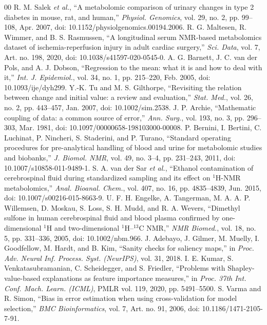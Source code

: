 \documentclass[conference]{IEEEtran}
\begin{document}
\begin{thebibliography}{00}
 R. M. Salek \textit{et al.}, ``A metabolomic comparison of urinary changes in type 2 diabetes in mouse, rat, and human,'' \textit{Physiol. Genomics}, vol. 29, no. 2, pp. 99--108, Apr. 2007, doi: 10.1152/physiolgenomics.00194.2006.
 R. G. Maltesen, R. Wimmer, and B. S. Rasmussen, ``A longitudinal serum NMR-based metabolomics dataset of ischemia-reperfusion injury in adult cardiac surgery,'' \textit{Sci. Data}, vol. 7, Art. no. 198, 2020, doi: 10.1038/s41597-020-0545-0.
 A. G. Barnett, J. C. van der Pols, and A. J. Dobson, ``Regression to the mean: what it is and how to deal with it,'' \textit{Int. J. Epidemiol.}, vol. 34, no. 1, pp. 215--220, Feb. 2005, doi: 10.1093/ije/dyh299.
 Y.-K. Tu and M. S. Gilthorpe, ``Revisiting the relation between change and initial value: a review and evaluation,'' \textit{Stat. Med.}, vol. 26, no. 2, pp. 443--457, Jan. 2007, doi: 10.1002/sim.2538.
 J. P. Archie, ``Mathematic coupling of data: a common source of error,'' \textit{Ann. Surg.}, vol. 193, no. 3, pp. 296--303, Mar. 1981, doi: 10.1097/00000658-198103000-00008.
 P. Bernini, I. Bertini, C. Luchinat, P. Nincheri, S. Staderini, and P. Turano, ``Standard operating procedures for pre-analytical handling of blood and urine for metabolomic studies and biobanks,'' \textit{J. Biomol. NMR}, vol. 49, no. 3--4, pp. 231--243, 2011, doi: 10.1007/s10858-011-9489-1.
 S. A. van der Sar \textit{et al.}, ``Ethanol contamination of cerebrospinal fluid during standardized sampling and its effect on $^1$H-NMR metabolomics,'' \textit{Anal. Bioanal. Chem.}, vol. 407, no. 16, pp. 4835--4839, Jun. 2015, doi: 10.1007/s00216-015-8663-9.
 U. F. H. Engelke, A. Tangerman, M. A. A. P. Willemsen, D. Moskau, S. Loss, S. H. Mudd, and R. A. Wevers, ``Dimethyl sulfone in human cerebrospinal fluid and blood plasma confirmed by one-dimensional $^1$H and two-dimensional $^1$H--$^{13}$C NMR,'' \textit{NMR Biomed.}, vol. 18, no. 5, pp. 331--336, 2005, doi: 10.1002/nbm.966.
 J. Adebayo, J. Gilmer, M. Muelly, I. Goodfellow, M. Hardt, and B. Kim, ``Sanity checks for saliency maps,'' in \textit{Proc. Adv. Neural Inf. Process. Syst. (NeurIPS)}, vol. 31, 2018.
 I. E. Kumar, S. Venkatasubramanian, C. Scheidegger, and S. Friedler, ``Problems with Shapley-value-based explanations as feature importance measures,'' in \textit{Proc. 37th Int. Conf. Mach. Learn. (ICML)}, PMLR vol. 119, 2020, pp. 5491--5500.
 S. Varma and R. Simon, ``Bias in error estimation when using cross-validation for model selection,'' \textit{BMC Bioinformatics}, vol. 7, Art. no. 91, 2006, doi: 10.1186/1471-2105-7-91.

\end{thebibliography}
\end{document}
